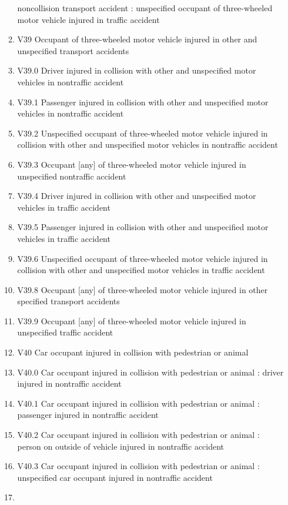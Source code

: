 \documentclass[
]{scrartcl}
\begin{document}
\begin{itemize}
\begin{enumerate}
    noncollision transport accident : unspecified occupant of
    three-wheeled motor vehicle injured in traffic accident
  \item
    V39 Occupant of three-wheeled motor vehicle injured in other and
    unspecified transport accidents
  \item
    V39.0 Driver injured in collision with other and unspecified motor
    vehicles in nontraffic accident
  \item
    V39.1 Passenger injured in collision with other and unspecified
    motor vehicles in nontraffic accident
  \item
    V39.2 Unspecified occupant of three-wheeled motor vehicle injured in
    collision with other and unspecified motor vehicles in nontraffic
    accident
  \item
    V39.3 Occupant {[}any{]} of three-wheeled motor vehicle injured in
    unspecified nontraffic accident
  \item
    V39.4 Driver injured in collision with other and unspecified motor
    vehicles in traffic accident
  \item
    V39.5 Passenger injured in collision with other and unspecified
    motor vehicles in traffic accident
  \item
    V39.6 Unspecified occupant of three-wheeled motor vehicle injured in
    collision with other and unspecified motor vehicles in traffic
    accident
  \item
    V39.8 Occupant {[}any{]} of three-wheeled motor vehicle injured in
    other specified transport accidents
  \item
    V39.9 Occupant {[}any{]} of three-wheeled motor vehicle injured in
    unspecified traffic accident
  \item
    V40 Car occupant injured in collision with pedestrian or animal
  \item
    V40.0 Car occupant injured in collision with pedestrian or animal :
    driver injured in nontraffic accident
  \item
    V40.1 Car occupant injured in collision with pedestrian or animal :
    passenger injured in nontraffic accident
  \item
    V40.2 Car occupant injured in collision with pedestrian or animal :
    person on outside of vehicle injured in nontraffic accident
  \item
    V40.3 Car occupant injured in collision with pedestrian or animal :
    unspecified car occupant injured in nontraffic accident
  \item

\end{enumerate}
\end{itemize}
\end{document}
